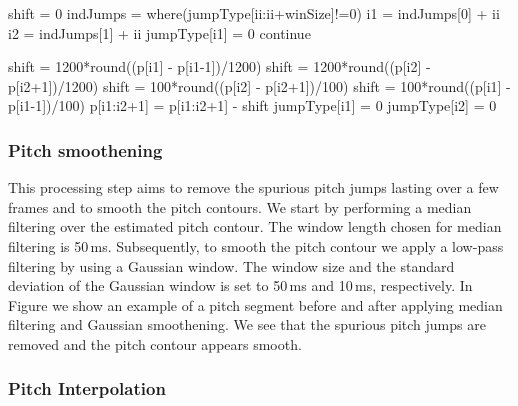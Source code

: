 {{\begin{algorithm}
\begin{algorithmic}
						
			\State shift = 0
			\State indJumps = where(jumpType[ii:ii+winSize]!=0)			
							
				\State i1 = indJumps[0] + ii
				\State i2 = indJumps[1]	+ ii			
					\State jumpType[i1] = 0
					\State continue			
				\EndIf
				
						\State shift = 1200*round((p[i1] - p[i1-1])/1200)
						\State shift = 1200*round((p[i2] - p[i2+1])/1200)
						\State shift = 100*round((p[i2] - p[i2+1])/100)
						\State shift = 100*round((p[i1] - p[i1-1])/100)
					\EndIf
				\EndIf
			\EndIf
			\State p[i1:i2+1] = p[i1:i2+1] - shift
			\State jumpType[i1] = 0
			\State jumpType[i2] = 0		
		
		\EndFor
		
	\end{algorithmic}
\end{algorithm}


\subsubsection{Pitch smoothening}
\label{sec:data_processing_pitch_smoothening}

This processing step aims to remove the spurious pitch jumps lasting over a few frames and to smooth the pitch contours. We start by performing a median filtering over the estimated pitch contour. The window length chosen for median filtering is 50\,ms. Subsequently, to smooth the pitch contour we apply a low-pass filtering by using a Gaussian window. The window size and the standard deviation of the Gaussian window is set to 50\,ms and 10\,ms, respectively. In Figure  we show an example of a pitch segment before and after applying median filtering and Gaussian smoothening. We see that the spurious pitch jumps are removed and the pitch contour appears smooth.


\subsubsection{Pitch Interpolation}
\label{sec:data_processing_pitch_interpolation}


}}
